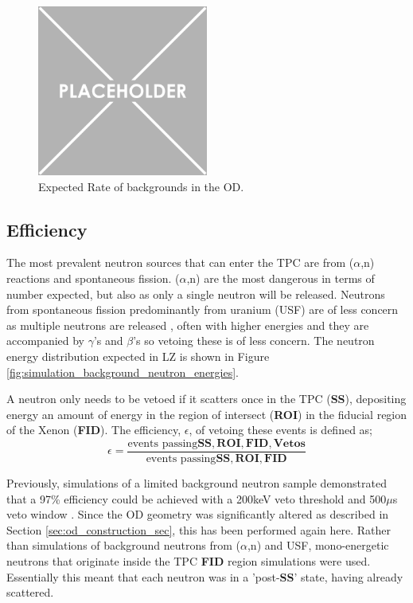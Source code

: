 \begin{figure}
    \centering
    \includegraphics[width=0.5\textwidth]{Figures/Placeholder.png}
    \caption{Expected Rate of backgrounds in the OD.}
    \label{fig:OD_estimated_background_rate}
\end{figure}



\subsection{Efficiency}
\par
The most prevalent neutron sources that can enter the TPC are from ($\alpha$,n) reactions and spontaneous fission.
($\alpha$,n) are the most dangerous in terms of number expected, but also as only a single neutron will be released.
Neutrons from spontaneous fission predominantly from uranium (USF) are of less concern as multiple neutrons are released \cite{usf_ref}, often with higher energies and they are accompanied by $\gamma$'s and $\beta$'s so vetoing these is of less concern.
The neutron energy distribution expected in LZ is shown in Figure \ref{fig:simulation_background_neutron_energies}.


\par
A neutron only needs to be vetoed if it scatters once in the TPC (\textbf{SS}), depositing energy an amount of energy in the region of intersect (\textbf{ROI}) in the fiducial region of the Xenon (\textbf{FID}).
The efficiency, $\epsilon$, of vetoing these events is defined as;
\begin{equation}
    \epsilon = \frac{\text{events passing}\mathbf{SS, ROI, FID, Vetos}}{\text{events passing}\mathbf{SS, ROI, FID}}
    \label{eq:neutron_efficiency}
\end{equation}

\par
Previously, simulations of a limited background neutron sample demonstrated that a 97\% efficiency could be achieved with a 200keV veto threshold and 500$\mu$s veto window \cite{LZ_TechnicalDesignReview_ref}.
Since the OD geometry was significantly altered as described in Section \ref{sec:od_construction_sec}, this has been performed again here.
Rather than simulations of background neutrons from ($\alpha$,n) and USF, mono-energetic neutrons that originate inside the TPC \textbf{FID} region simulations were used.
Essentially this meant that each neutron was in a 'post-\textbf{SS}' state, having already scattered.

